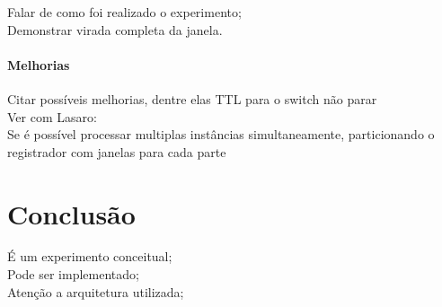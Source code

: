 \documentclass[12pt,
openright, 
oneside,
a4paper,
brazil]{facom-ufu-abntex2}
\theoremstyle{definition}
\begin{document}
\begin{center}
    Falar de como foi realizado o experimento;\\
    Demonstrar virada completa da janela.
\end{center}

\subsubsection{Melhorias}
\begin{center}
    Citar possíveis melhorias, dentre elas TTL para o switch não parar\\
    Ver com Lasaro:\\
        Se é possível processar multiplas instâncias simultaneamente, particionando o registrador com janelas para cada parte
\end{center}

\chapter{Conclusão}
\begin{center}
    É um experimento conceitual;\\
    Pode ser implementado;\\
    Atenção a arquitetura utilizada;
\end{center}

% 

\end{document}
